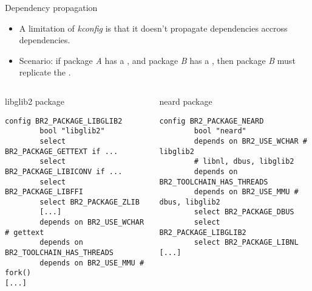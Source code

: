 \begin{frame}[fragile]{Dependency propagation}

  \begin{itemize}
  \item A limitation of {\em kconfig} is that it doesn't propagate
     dependencies accross  dependencies.
  \item Scenario: if package {\em A} has a , and
    package {\em B} has a , then package {\em B} must
    replicate the .
  \end{itemize}

  \begin{columns}
    \begin{block}{libglib2 package}
      \tiny
\begin{verbatim}
config BR2_PACKAGE_LIBGLIB2
        bool "libglib2"
        select BR2_PACKAGE_GETTEXT if ...
        select BR2_PACKAGE_LIBICONV if ...
        select BR2_PACKAGE_LIBFFI
        select BR2_PACKAGE_ZLIB
        [...]
        depends on BR2_USE_WCHAR # gettext
        depends on BR2_TOOLCHAIN_HAS_THREADS
        depends on BR2_USE_MMU # fork()
[...]
\end{verbatim}
    \end{block}
    \begin{block}{neard package}
      \tiny
\begin{verbatim}
config BR2_PACKAGE_NEARD
        bool "neard"
        depends on BR2_USE_WCHAR # libglib2
        # libnl, dbus, libglib2
        depends on BR2_TOOLCHAIN_HAS_THREADS
        depends on BR2_USE_MMU # dbus, libglib2
        select BR2_PACKAGE_DBUS
        select BR2_PACKAGE_LIBGLIB2
        select BR2_PACKAGE_LIBNL
[...]
\end{verbatim}
    \end{block}
  \end{columns}
\end{frame}

